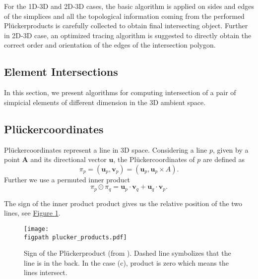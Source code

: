 \documentclass{elsarticle}
\newcommand{\fig}[1]{\hyperref[#1]{Figure \ref{#1}}}
\newcommand{\figpath}{figures/}
\def\vc#1{\mathbf{\boldsymbol{#1}}}     %
\newcommand{\plucker}{Pl\"{u}cker}
\begin{document}
\begin{figure}[!htb]
  \centering
  \setcounter{subfigure}{0}
  \hspace{10pt}
\end{figure}
      
For the 1D-3D and 2D-3D cases, the basic algorithm is applied on sides and edges of the simplices and 
all the topological information coming from the performed \plucker products is carefully collected
to obtain final intersecting object.
Further in 2D-3D case, an optimized tracing algorithm is suggested to directly obtain the correct order and 
orientation of the edges of the intersection polygon.


\subsection{Element Intersections}
\label{sec:elements_intersections}
In this section, we present algorithms for computing intersection of a pair of simpicial elements of different dimension in the 3D ambient space.


\subsection{\plucker coordinates}
\plucker coordinates represent a line in 3D space.
Considering a line $p$, given by a point $\vc A$ and its directional vector $\vc{u}$, 
the \plucker coordinates of $p$ are defined as
\[ \pi_p = (\vc{u}_p, \vc{v}_p) = (\vc{u}_p, \vc{u}_p\times A). \]
Further we use a permuted inner product
\[\pi_p \odot \pi_q = \vc{u}_p\cdot \vc{v}_q + \vc{u}_q \cdot \vc{v}_p. \]

The sign of the inner product product gives us the relative position of the two lines, 
see \fig{fig:plucker_products}.

\begin{figure}[!htb]
  \begin{center}        
    \texttt{[image: \\figpath plucker\_products.pdf]}
  \end{center}
  \caption{Sign of the \plucker product (from \cite{fris_dp_2015}). Dashed line symbolizes that the line 
           is in the back. In the case (c), product is zero which means the lines intersect.}
  \label{fig:plucker_products}
\end{figure}
\end{document}
